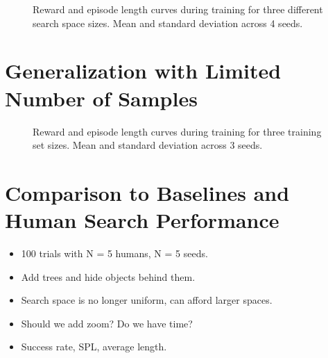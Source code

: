 
\begin{figure}
    \centering
    
    
    
    \label{fig:train-shape}
    \caption[Search space size learning curve.]{Reward and episode length curves during training for three different search space sizes. Mean and standard deviation across 4 seeds.}
\end{figure}

\section{Generalization with Limited Number of Samples}

\begin{figure}
    \centering
    
    
    
    \label{fig:samples}
    \caption[Generalization results.]{Reward and episode length curves during training for three training set sizes. Mean and standard deviation across 3 seeds.}
\end{figure}


\section{Comparison to Baselines and Human Search Performance}

\begin{itemize}
    \item 100 trials with N = 5 humans, N = 5 seeds.
    \item Add trees and hide objects behind them.
    \item Search space is no longer uniform, can afford larger spaces.
    \item Should we add zoom? Do we have time?
    \item Success rate, SPL, average length.
\end{itemize}